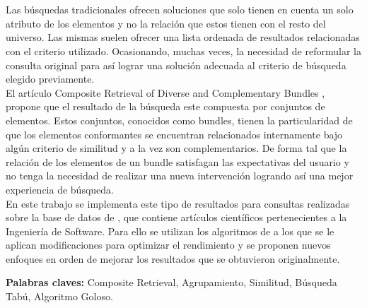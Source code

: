 \chapter*{\runtitulo}

\noindent Las búsquedas tradicionales ofrecen soluciones que solo tienen en cuenta un solo atributo de los elementos y no la relación que estos tienen con el resto del universo. Las mismas suelen ofrecer una lista ordenada de resultados relacionadas con
el criterio utilizado. Ocasionando, muchas veces, la necesidad de reformular la consulta original para así lograr una solución adecuada al criterio de búsqueda elegido previamente.\\
El artículo Composite Retrieval of Diverse and Complementary Bundles \cite{compositeRetrival}, propone que el resultado de la búsqueda este compuesta por conjuntos de elementos. Estos conjuntos, conocidos como bundles, tienen la particularidad de que los elementos conformantes se encuentran relacionados internamente bajo algún criterio de similitud y a la vez son complementarios. De forma tal que la relación de los elementos de un bundle satisfagan las expectativas del usuario y no tenga la necesidad de realizar una nueva intervención logrando así una mejor experiencia de búsqueda.\\
En este trabajo se implementa este tipo de resultados para consultas realizadas sobre la base de datos de \cite{dataDrive}, que contiene artículos científicos pertenecientes a la Ingeniería de Software. Para ello se utilizan los algoritmos de \cite{compositeRetrival} a los que se le aplican modificaciones para optimizar el rendimiento y se proponen nuevos enfoques en orden de mejorar los resultados que se obtuvieron originalmente.

\bigskip

\noindent\textbf{Palabras claves:} Composite Retrieval, Agrupamiento, Similitud, Búsqueda Tabú, Algoritmo Goloso.